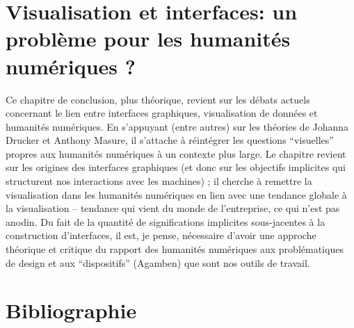\documentclass[a4paper, 12pt, twoside]{book}
\begin{document}
\chapter{Visualisation et interfaces: un problème pour les humanités numériques ?}
Ce chapitre de conclusion, plus théorique, revient sur les débats actuels concernant le lien entre interfaces graphiques, visualisation de données et humanités numériques. En s'appuyant (entre autres) sur les théories de Johanna Drucker et Anthony Masure, il s'attache à réintégrer les questions \enquote{visuelles} propres aux humanités numériques à un contexte plus large. Le chapitre revient sur les origines des interfaces graphiques (et donc sur les objectifs implicites qui structurent nos interactions avec les machines) ; il cherche à remettre la visualisation dans les humanités numériques en lien avec une tendance globale à la visualisation -- tendance qui vient du monde de l'entreprise, ce qui n'est pas anodin. Du fait de la quantité de significations implicites sous-jacentes à la construction d'interfaces, il est, je pense, nécessaire d'avoir une approche théorique et critique du rapport des humanités numériques aux problématiques de design et aux \enquote{dispositifs} (Agamben) que sont nos outils de travail.





\pagebreak
\chapter*{Bibliographie}
\printbibliography[heading=subbibintoc,keyword={katabase},title={À propos du projet Katabase / MSS}]
\printbibliography[heading=subbibintoc,keyword={visualisation},title={Visualisation et design d'interfaces}]




\tableofcontents
\end{document}
